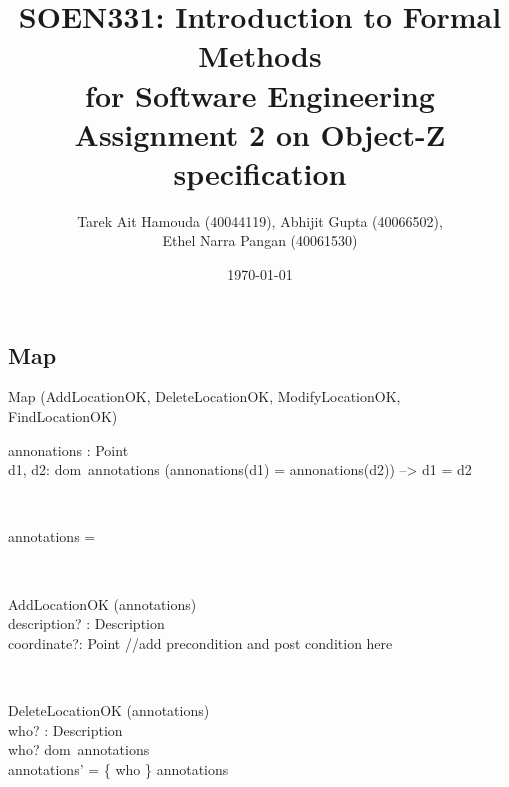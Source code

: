 \documentclass[12pt]{article}
\title{SOEN331: Introduction to Formal Methods\\for Software Engineering\\
Assignment 2 on Object-Z specification}
\author{Tarek Ait Hamouda (40044119), Abhijit Gupta (40066502),\\ 
Ethel Narra Pangan (40061530)}
\date{\today}
\begin{document}
\begin{spacing}{1.5}

\maketitle

\newpage

\section{Map}

\begin{class}{Map}
\also
\upharpoonright (AddLocationOK, DeleteLocationOK, ModifyLocationOK, FindLocationOK) \\
\begin{state}
annonations : Point \pfun {}\\
\where
\forall d1, d2: dom~annotations \bullet (annonations(d1) = annonations(d2)) --> d1 = d2
\end{state} \\
\begin{init}
annotations = \emptyset %
\end{init} \\
\begin{op}{AddLocationOK}
\Delta (annotations) \\
description? : Description\\
coordinate?: Point 
\ST
//add precondition and post condition here
\end{op}\\
\begin{op}{DeleteLocationOK}
\Delta (annotations) \\
who? : Description\\
\ST
who? \in dom~annotations\\
annotations' = \{ who \} \ndres annotations
\end{op}\\
\begin{op}{ModifyLocationsOK}
\Delta (annotations) \\
description? : Description\\
coordinates? : Point
\ST


}
\end{op}\\
\end{class}





\end{spacing}
\end{document}
